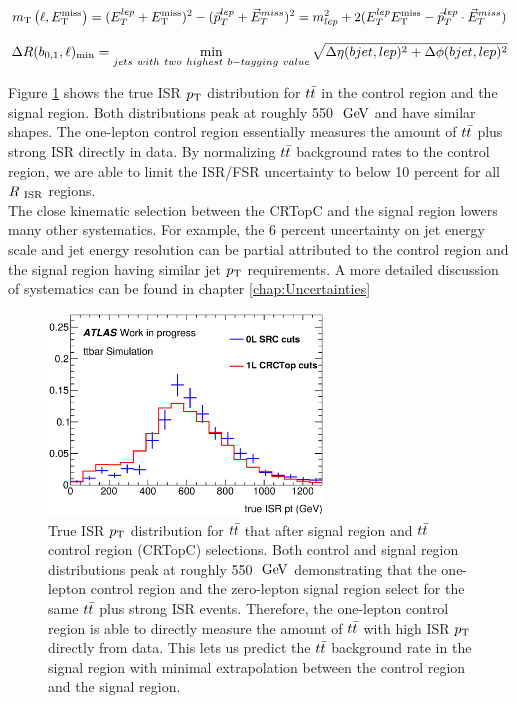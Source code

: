 \begin{equation}
m_{\mathrm{T}}\left(\ell,E_{\mathrm{T}}^{\mathrm{miss}}\right) = (E_{T}^{lep}+E_{\mathrm{T}}^{\mathrm{miss}})^{2}-({\vec {p}}_{T}^{lep}+{\vec {E}}_{T}^{miss})^{2} =m_{lep}^{2}+2(E_{T}^{lep}E_{\mathrm{T}}^{\mathrm{miss}}-{\vec {p}}_{T}^{lep}\cdot {\vec {E}}_{T}^{miss})
\label{eqn:mtlep}
\end{equation}

\begin{equation}
\mindrblep = \min_{jets~with~two~highest~b-tagging~value} \sqrt{ \Delta\eta(bjet, lep)^2 + \Delta\phi(bjet, lep)^2}
\label{eqn:mindrblep}
\end{equation}


\indent Figure \ref{fig:ttbar:CR:trueISRpt} shows the true ISR $\pt$ distribution for $\ttbar$ in the control region and the signal region.  Both distributions peak at roughly 550 $\gev$ and have similar shapes.  The one-lepton control region essentially measures the amount of $\ttbar$ plus strong ISR directly in data.  By normalizing $\ttbar$ background rates to the control region, we are able to limit the ISR/FSR uncertainty to below 10 percent for all $R_{~\mathrm{ISR}}$ regions.  \\

\indent The close kinematic selection between the CRTopC and the signal region lowers many other systematics.   For example, the 6 percent uncertainty on jet energy scale and jet energy resolution can be partial attributed to the control region and the signal region having similar jet $\pt$ requirements. A more detailed discussion of systematics can be found in chapter \ref{chap:Uncertainties} \\

\begin{figure}[h!]
  \centering
	\includegraphics[width=0.65\textwidth]{./figures/ttbar/truePtISR_SRC_CRC_compare.eps}
	\caption[True ISR $\pt$ distribution for $\ttbar$ that after signal region and $\ttbar$ control region (CRTopC) selections]{True ISR $\pt$ distribution for $\ttbar$ that after signal region and $\ttbar$ control region (CRTopC) selections.  Both control and signal region distributions peak at roughly 550 $\gev$ demonstrating that the one-lepton control region and the zero-lepton signal region select for the same $\ttbar$ plus strong ISR events.  Therefore, the one-lepton control region is able to directly measure the amount of $\ttbar$ with high ISR $\pt$ directly from data.  This lets us predict the $\ttbar$ background rate in the signal region with minimal extrapolation between the control region and the signal region.}
	\label{fig:ttbar:CR:trueISRpt}
\end{figure}

